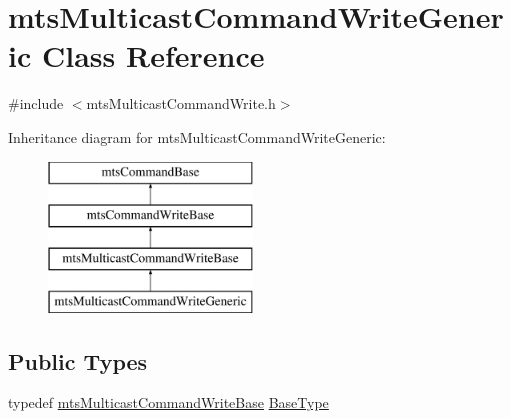 \hypertarget{classmts_multicast_command_write_generic}{}\section{mts\+Multicast\+Command\+Write\+Generic Class Reference}
\label{classmts_multicast_command_write_generic}


{\ttfamily \#include $<$mts\+Multicast\+Command\+Write.\+h$>$}

Inheritance diagram for mts\+Multicast\+Command\+Write\+Generic\+:\begin{figure}[H]
\begin{center}
\leavevmode
\includegraphics[height=4.000000cm]{d4/d0a/classmts_multicast_command_write_generic}
\end{center}
\end{figure}
\subsection*{Public Types}
\begin{DoxyCompactItemize}
\item 
typedef \hyperlink{classmts_multicast_command_write_base}{mts\+Multicast\+Command\+Write\+Base} \hyperlink{classmts_multicast_command_write_generic_ad9b380aee1bd7519d91697092a045bf9}{Base\+Type}
\end{DoxyCompactItemize}
